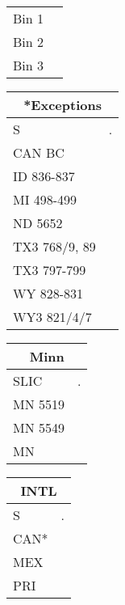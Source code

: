 \documentclass{article}
\begin{document}
\hspace{10em}
\begin{tabular}[t]{c|c}
    Bin 1 & \cellcolor{blue} \\
    Bin 2 & \cellcolor{yellow} \\
    Bin 3 & \cellcolor{red}
\end{tabular}
\vspace{5ex}

\begin{tabular}[t]{ll}
\multicolumn{2}{c}{\textbf{*Exceptions}} \\
\toprule
S                 & .    \\ \midrule
CAN BC          & \cellcolor{blue}   \\
ID 836-837      & \cellcolor{red}    \\
MI 498-499      & \cellcolor{red}    \\
ND 5652         & \cellcolor{yellow} \\
TX3 768/9, 89 & \cellcolor{red}    \\
TX3 797-799   & \cellcolor{red}    \\
WY 828-831      & \cellcolor{red}    \\
WY3 821/4/7   & \cellcolor{blue}  \\ \bottomrule
\end{tabular}
\hspace{1em}
\begin{tabular}[t]{ll}
\multicolumn{2}{c}{\textbf{Minn}} \\
\toprule
SLIC                 & .    \\ \midrule
MN 5519 & \cellcolor{blue}   \\
MN 5549 & \cellcolor{blue}   \\
MN      & \cellcolor{yellow} \\ \bottomrule
\end{tabular}
\hspace{1em}
\begin{tabular}[t]{ll}
\multicolumn{2}{c}{\textbf{INTL}} \\
\toprule
S                 & .    \\ \midrule
CAN* & \cellcolor{red}  \\
MEX  & \cellcolor{blue} \\
PRI  & \cellcolor{red} \\ \bottomrule
\end{tabular}
\hspace{1em}
\end{document}

